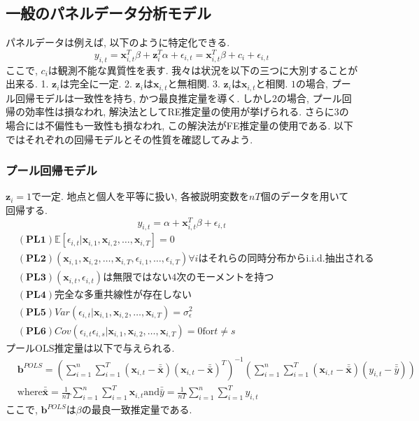 \documentclass[paper=a4paper,fontsize=10pt]{jlreq}
\begin{document}
\subsection{一般のパネルデータ分析モデル}
パネルデータは例えば, 以下のように特定化できる.
\begin{equation*}
 y_{i,t} = \mathbf{x}_{i,t}^T \beta + \mathbf{z}_{i}^T \alpha + \epsilon_{i,t} = \mathbf{x}_{i,t}^T \beta + c_i + \epsilon_{i,t}
\end{equation*}
ここで, $c_i$は観測不能な異質性を表す. 我々は状況を以下の三つに大別することが出来る. 1. $\mathbf{z}_i$は完全に一定. 2. $\mathbf{z}_i$は$\mathbf{x}_{i,t}$と無相関. 3. $\mathbf{z}_i$は$\mathbf{x}_{i,t}$と相関. $1$の場合, プール回帰モデルは一致性を持ち, かつ最良推定量を導く. しかし$2$の場合, プール回帰の効率性は損なわれ, 解決法としてRE推定量の使用が挙げられる. さらに$3$の場合には不偏性も一致性も損なわれ, この解決法がFE推定量の使用である. 以下ではそれぞれの回帰モデルとその性質を確認してみよう.\\

\subsubsection{プール回帰モデル}
$\mathbf{z}_{i} = 1$で一定. 地点と個人を平等に扱い, 各被説明変数を$nT$個のデータを用いて回帰する. 
\begin{equation*}
  y_{i,t} = \alpha + \mathbf{x}_{i,t}^T \beta + \epsilon_{i,t}
\end{equation*}
\begin{align*}
  &\mathbf{(PL1)}　\mathbb{E}[\epsilon_{i,t}|\mathbf{x}_{i,1}, \mathbf{x}_{i,2}, \dots, \mathbf{x}_{i,T}]=0\\
  &\mathbf{(PL2)}　(\mathbf{x}_{i,1}, \mathbf{x}_{i,2}, \dots, \mathbf{x}_{i,T}, \epsilon_{i,1}, \dots, \epsilon_{i,T}) \forall i\text{はそれらの同時分布からi.i.d.抽出される}\\
  &\mathbf{(PL3)}　(\mathbf{x}_{i,t}, \epsilon_{i,t})\text{は無限ではない4次のモーメントを持つ}\\
  &\mathbf{(PL4)}　\text{完全な多重共線性が存在しない}\\
  &\mathbf{(PL5)}　Var(\epsilon_{i,t}|\mathbf{x}_{i,1}, \mathbf{x}_{i,2}, \dots, \mathbf{x}_{i,T}) = \sigma_\epsilon^2\\
  &\mathbf{(PL6)}　Cov(\epsilon_{i,t}\epsilon_{i,s}|\mathbf{x}_{i,1}, \mathbf{x}_{i,2}, \dots, \mathbf{x}_{i,T}) = 0　\text{for}　t \neq s
\end{align*}
プールOLS推定量は以下で与えられる.
\begin{align*}
  &\mathbf{b}^{POLS} = (\sum_{i=1}^{n}\sum_{i=1}^{T}(\mathbf{x}_{i,t} - \bar{\bar{\mathbf{x}}})(\mathbf{x}_{i,t} - \bar{\bar{\mathbf{x}}})^T)^{-1} (\sum_{i=1}^{n}\sum_{i=1}^{T}(\mathbf{x}_{i,t} - \bar{\bar{\mathbf{x}}})(y_{i,t} - \bar{\bar{y}}))\\
  &\text{where}　\bar{\bar{\mathbf{x}}} = \frac{1}{nT}\sum_{i=1}^{n}\sum_{i=1}^{T}\mathbf{x}_{i,t}　\text{and}　\bar{\bar{y}} = \frac{1}{nT}\sum_{i=1}^{n}\sum_{i=1}^{T}y_{i,t}
\end{align*}
ここで, $\mathbf{b}^{POLS}$は$\beta$の最良一致推定量である.\\
\end{document}
